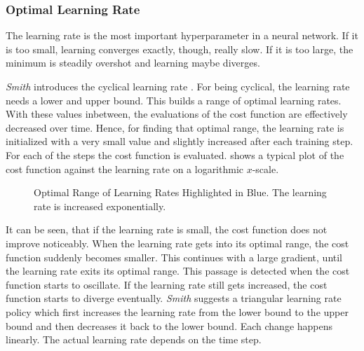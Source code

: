 \subsubsection{Optimal Learning Rate}
\label{sec:improving-performance-learning-rate}
The learning rate is the most important hyperparameter in a neural network.
If it is too small, learning converges exactly, though, really slow.
If it is too large, the minimum is steadily overshot and learning maybe diverges.

\textit{Smith} introduces the cyclical learning rate \cite{DBLP:journals/corr/Smith15a}.
For being cyclical, the learning rate needs a lower and upper bound.
This builds a range of optimal learning rates.
With these values inbetween, the evaluations of the cost function are effectively decreased over time.
Hence, for finding that optimal range, the learning rate is initialized with a very small value and slightly increased after each training step.
For each of the steps the cost function is evaluated.
 shows a typical plot of the cost function against the learning rate on a logarithmic $x$-scale.
\begin{figure}
	\setlength{}
	\setlength{}
	\centering
	
	\caption[Optimal Range of Learning Rates]{Optimal Range of Learning Rates Highlighted in Blue. The learning rate is increased exponentially.}
	\label{fig:optimal-learning-rate-range}
\end{figure}
It can be seen, that if the learning rate is small, the cost function does not improve noticeably.
When the learning rate gets into its optimal range, the cost function suddenly becomes smaller.
This continues with a large gradient, until the learning rate exits its optimal range.
This passage is detected when the cost function starts to oscillate.
If the learning rate still gets increased, the cost function starts to diverge eventually.
\textit{Smith} suggests a triangular learning rate policy which first increases the learning rate from the lower bound to the upper bound and then decreases it back to the lower bound.
Each change happens linearly.
The actual learning rate depends on the time step.

